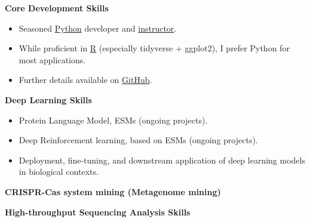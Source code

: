 \textbf{Core Development Skills}\\

\begin{itemize}
    \item Seasoned \underline{Python} developer and \href{https://www.bioinfo.info/p/t_pc/goods_pc_detail/goods_detail/course_2SvfNlIVzrKfOcexHk9Nute5Bhd}{instructor}.
    \item While proficient in \underline{R} (especially tidyverse + ggplot2), I prefer Python for most applications.
    \item Further details available on \href{https://github.com/hermanzhaozzzz}{GitHub}.
\end{itemize}
\textbf{Deep Learning Skills}
\begin{itemize}
    \item Protein Language Model, ESMs (ongoing projects).
    \item Deep Reinforcement learning, based on ESMs (ongoing projects).
    \item Deployment, fine-tuning, and downstream application of deep learning models in biological contexts.
\end{itemize}

\textbf{CRISPR-Cas system mining (Metagenome mining)}

\textbf{High-throughput Sequencing Analysis Skills}
  
  
  
  




